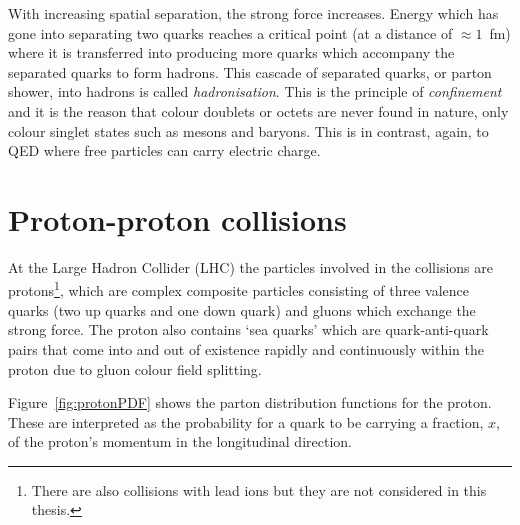 
With increasing spatial separation, the strong force increases. Energy which has gone into separating two quarks reaches a critical point (at a distance of $\approx 1$~fm) where it is transferred into producing more quarks which accompany the separated quarks to form hadrons. This cascade of separated quarks, or parton shower, into hadrons is called \emph{hadronisation}. This is the principle of \emph{confinement} and it is the reason that colour doublets or octets are never found in nature, only colour singlet states such as mesons and baryons. This is in contrast, again, to QED where free particles can carry electric charge.


\section{Proton-proton collisions}
At the Large Hadron Collider (LHC) the particles involved in the collisions are protons\footnote{There are also collisions with lead ions but they are not considered in this thesis.}, which are complex composite particles consisting of three valence quarks (two up quarks and one down quark) and gluons which exchange the strong force. The proton also contains `sea quarks' which are quark-anti-quark pairs that come into and out of existence rapidly and continuously within the proton due to gluon colour field splitting.

Figure~\ref{fig:protonPDF} shows the parton distribution functions for the proton. These are interpreted as the probability for a quark to be carrying a fraction, $x$, of the proton's momentum in the longitudinal direction.

